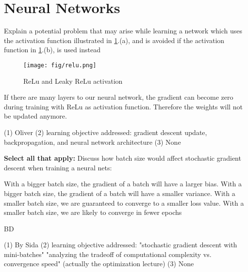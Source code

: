 \section{Neural Networks}
\begin{questions}
\question Explain a potential problem that may arise while learning a network which uses the activation function illustrated in \ref{fig:relu}.(a), and is avoided if the activation function in \ref{fig:relu}.(b), is used instead
\begin{figure}[!h]
    \centering
    \texttt{[image: fig/relu.png]}
    \caption{ReLu and Leaky ReLu activation}
    \label{fig:relu}
\end{figure}
    \fillwithlines{2em}
    \begin{soln}
    If there are many layers to our neural network, the gradient can become zero during training with ReLu as activation function. Therefore the weights will not be updated anymore. 
    \end{soln}
    
    \begin{qauthor}
    (1) Oliver (2) learning objective addressed: gradient descent update, backpropagation, and neural network architecture (3) None
    \end{qauthor}
    
    \question  \textbf{Select all that apply:} Discuss how batch size would affect stochastic gradient descent when training a neural nets:
    
    {%
    \checkboxchar{$\Box$} %
    \begin{checkboxes}
     \choice With a bigger batch size, the gradient of a batch will have a larger bias. 
     \choice With a bigger batch size, the gradient of a batch will have a smaller variance. 
     \choice With a smaller batch size, we are guaranteed to converge to a smaller loss value.
     \choice With a smaller batch size, we are likely to converge in fewer epochs
    \end{checkboxes}
    }

    \begin{soln}
    BD
    \end{soln}
    
    \begin{qauthor}
    (1) By Sida (2) learning objective addressed: "stochastic gradient descent with mini-batches" "analyzing the tradeoff of computational complexity vs. convergence speed" (actually the optimization lecture) (3) None
    \end{qauthor}
    

\end{questions}
